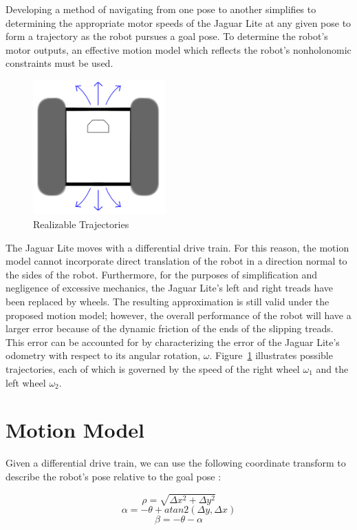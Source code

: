\documentclass[conference]{IEEEtran}
\begin{document}
Developing a method of navigating from one pose to another simplifies to determining 
the appropriate motor speeds of the Jaguar Lite at any given pose to form a trajectory as the robot pursues a goal pose.  
To determine the robot's motor outputs, an effective motion model which reflects
the robot's nonholonomic constraints must be used. 

\begin{figure}[!h]
\centering
\includegraphics[width =2in]{pic1.png}
\caption{Realizable Trajectories}
\label{fig2}
\end{figure}

The Jaguar Lite moves with a differential drive train.  For this reason, the motion model cannot 
incorporate direct translation of the robot in a direction normal to the sides of
the robot. Furthermore, for the purposes of simplification and negligence of excessive mechanics, 
the Jaguar Lite's left and right treads have been replaced by wheels. The 
resulting approximation is still valid under the proposed motion model; however, 
the overall performance of the robot will have a larger error because of the
dynamic friction of the ends of the slipping treads.  This error can be 
accounted for by characterizing the error of the Jaguar Lite's odometry
with respect to its angular rotation, $\omega$.
Figure~\ref{fig2} illustrates possible trajectories, each of which is 
governed by the speed of the right wheel $\omega_1$ and the left wheel $\omega_2$.



\section{Motion Model}
Given a differential drive train, we can use the following coordinate transform 
to describe the robot's pose relative to the goal pose \cite{Textbook}:

\begin{equation} \label{eq:rho}
\rho = \sqrt{\Delta x^2 + \Delta y^2}
\end{equation}
\begin{equation} \label{eq:alpha}
\alpha = -\theta + atan2(\Delta y, \Delta x)
\end{equation}
\begin{equation} \label{eq:beta}
\beta = -\theta -\alpha
\end{equation}
\end{document}
